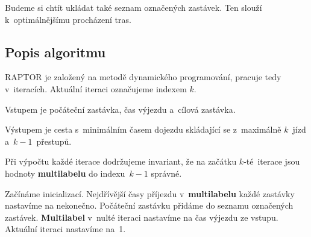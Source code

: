 Budeme si chtít ukládat také seznam označených zastávek. Ten slouží k~optimálnějšímu procházení tras.

\subsection{Popis algoritmu}\label{raptor-popisAlgo}

RAPTOR je založený na metodě dynamického programování, pracuje tedy v~iteracích. Aktuální iteraci označujeme indexem $k$.

Vstupem je počáteční zastávka, čas výjezdu a~cílová zastávka.

Výstupem je cesta s~minimálním časem dojezdu skládající se z~maximálně $k$~jízd a~$k-1$~přestupů.

Při výpočtu každé iterace dodržujeme invariant, že na začátku $k$-té~iterace jsou hodnoty \textbf{multilabelu} do indexu~$k-1$ správné.

Začínáme inicializací. Nejdřívější časy příjezdu v~\textbf{multilabelu} každé zastávky nastavíme na nekonečno. Počáteční zastávku přidáme do seznamu označených zastávek. \textbf{Multilabel} v~nulté iteraci nastavíme na čas výjezdu ze vstupu. Aktuální iteraci nastavíme na~1.

